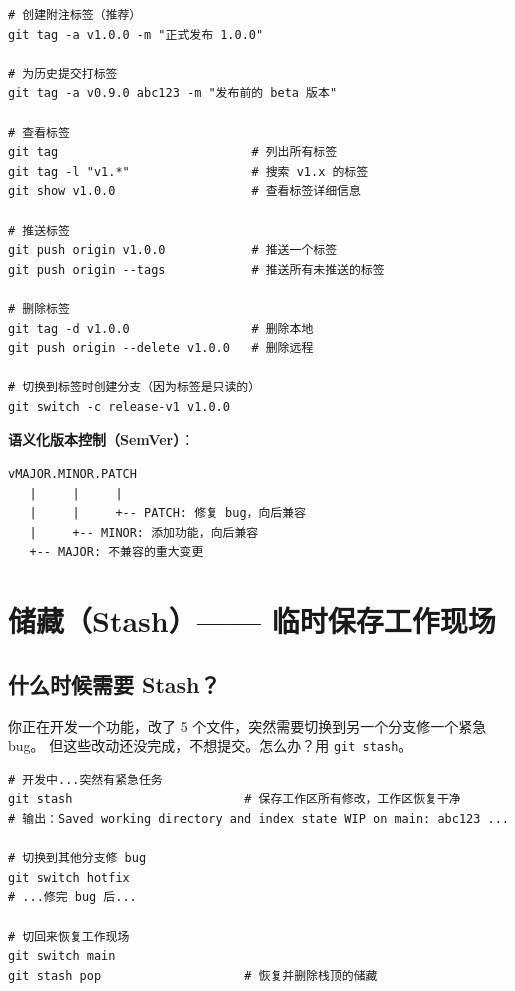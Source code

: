 \documentclass[12pt,a4paper]{article}
\begin{document}
\begin{lstlisting}
# 创建附注标签（推荐）
git tag -a v1.0.0 -m "正式发布 1.0.0"

# 为历史提交打标签
git tag -a v0.9.0 abc123 -m "发布前的 beta 版本"

# 查看标签
git tag                           # 列出所有标签
git tag -l "v1.*"                 # 搜索 v1.x 的标签
git show v1.0.0                   # 查看标签详细信息

# 推送标签
git push origin v1.0.0            # 推送一个标签
git push origin --tags            # 推送所有未推送的标签

# 删除标签
git tag -d v1.0.0                 # 删除本地
git push origin --delete v1.0.0   # 删除远程

# 切换到标签时创建分支（因为标签是只读的）
git switch -c release-v1 v1.0.0
\end{lstlisting}

\textbf{语义化版本控制（SemVer）}：
\begin{lstlisting}[numbers=none]
vMAJOR.MINOR.PATCH
   |     |     |
   |     |     +-- PATCH: 修复 bug，向后兼容
   |     +-- MINOR: 添加功能，向后兼容
   +-- MAJOR: 不兼容的重大变更
\end{lstlisting}

\section{储藏（Stash）—— 临时保存工作现场}

\subsection{什么时候需要 Stash？}

你正在开发一个功能，改了 5 个文件，突然需要切换到另一个分支修一个紧急 bug。
但这些改动还没完成，不想提交。怎么办？用 \texttt{git stash}。

\begin{lstlisting}
# 开发中...突然有紧急任务
git stash                        # 保存工作区所有修改，工作区恢复干净
# 输出：Saved working directory and index state WIP on main: abc123 ...

# 切换到其他分支修 bug
git switch hotfix
# ...修完 bug 后...

# 切回来恢复工作现场
git switch main
git stash pop                    # 恢复并删除栈顶的储藏
\end{lstlisting}
\end{document}
